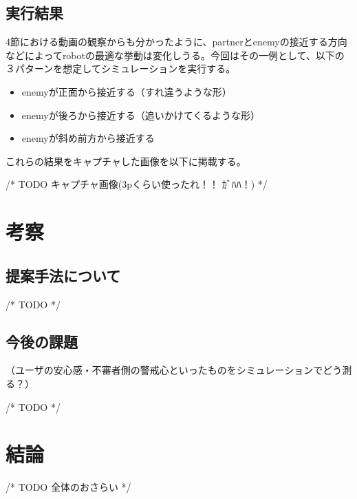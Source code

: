 \documentclass{kuisthesis}
\begin{document}
\subsection{実行結果}

4節における動画の観察からも分かったように、partnerとenemyの接近する方向などによってrobotの最適な挙動は変化しうる。今回はその一例として、以下の３パターンを想定してシミュレーションを実行する。

\begin{itemize}
	\item enemyが正面から接近する（すれ違うような形）
	\item enemyが後ろから接近する（追いかけてくるような形）
	\item enemyが斜め前方から接近する
\end{itemize}

これらの結果をキャプチャした画像を以下に掲載する。

/* TODO キャプチャ画像(3pくらい使ったれ！！ ｶﾞﾊﾊ！) */







\section{考察}

\subsection{提案手法について}
/* TODO  */ %

\subsection{今後の課題}

（ユーザの安心感・不審者側の警戒心といったものをシミュレーションでどう測る？）

/* TODO */

\section{結論}
/* TODO 全体のおさらい */
\end{document}

